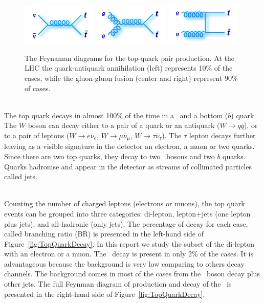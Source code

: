 \begin{figure}[h]
  \centering
  \includegraphics[width=0.32\textwidth]{../presentation/plots/ttbar_1.png}
  \includegraphics[width=0.32\textwidth]{../presentation/plots/ttbar_2.png}
  \includegraphics[width=0.32\textwidth]{../presentation/plots/ttbar_3.png}
  \caption{The Feynaman diagrams for the top-quark pair production. At the LHC the quark-antiquark annihilation (left) represents 10\% of the cases, while the gluon-gluon fusion (center and right) represent 90\% of cases.}
  \label{fig:TopQuarkFeynmanDiagrams}
\end{figure}

\ \\The top quark decays in almost 100\% of the time in a \Wboson~and a bottom ($b$) quark. The $W$ boson can decay either to a pair of a quark or an antiquark ($W\rightarrow q\bar{q}$), or to a pair of leptons ($W \rightarrow e\bar{\nu}_e$, $W \rightarrow \mu\bar{\nu}_\mu$, $W \rightarrow \tau\bar{\nu}_\tau$). The $\tau$ lepton decays further leaving as a visible signature in the detector an electron, a muon or two quarks. Since there are two top quarks, they decay to two \Wboson~bosons and two $b$ quarks. Quarks hadronise and appear in the detector as streams of collimated particles called jets. 

\ \\Counting the number of charged leptons (electrons or muons), the top quark events can be grouped into three categories: di-lepton, lepton+jets (one lepton plus jets), and all-hadronic (only jets). The percentage of decay for each case, called branching ratio (BR) is presented in the left-hand side of Figure~\ref{fig:TopQuarkDecay}. In this report we study the subset of the di-lepton with an electron or a muon. The \ttbaremu~decay is present in only 2\% of the cases. It is advantageous because the background is very low comparing to others decay channels. The background comes in most of the cases from the \Zboson~boson decay plus other jets. The full Feynman diagram of production and decay of the \ttbaremu~is presented in the right-hand side of Figure~\ref{fig:TopQuarkDecay}.

